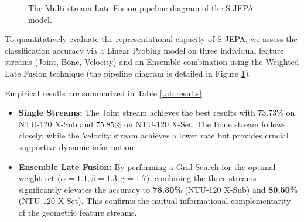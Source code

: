 \documentclass[conference]{IEEEtran}
\begin{document}
\begin{figure}[t]
{%
}
\caption{The Multi-stream Late Fusion pipeline diagram of the S-JEPA model.}
\label{fig:late_fusion_arch}
\end{figure}

To quantitatively evaluate the representational capacity of S-JEPA, we assess the classification accuracy via a Linear Probing model on three individual feature streams (Joint, Bone, Velocity) and an Ensemble combination using the Weighted Late Fusion technique (the pipeline diagram is detailed in Figure \ref{fig:late_fusion_arch}).


 

Empirical results are summarized in Table \ref{tab:results}:
\begin{itemize}
    \item \textbf{Single Streams:} The Joint stream achieves the best results with $73.73\%$ on NTU-120 X-Sub and $75.85\%$ on NTU-120 X-Set. The Bone stream follows closely, while the Velocity stream achieves a lower rate but provides crucial supportive dynamic information.
    \item \textbf{Ensemble Late Fusion:} By performing a Grid Search for the optimal weight set ($\alpha=1.1, \beta=1.3, \gamma=1.7$), combining the three streams significantly elevates the accuracy to \textbf{78.30\%} (NTU-120 X-Sub) and \textbf{80.50\%} (NTU-120 X-Set). This confirms the mutual informational complementarity of the geometric feature streams.
\end{itemize}
\end{document}

